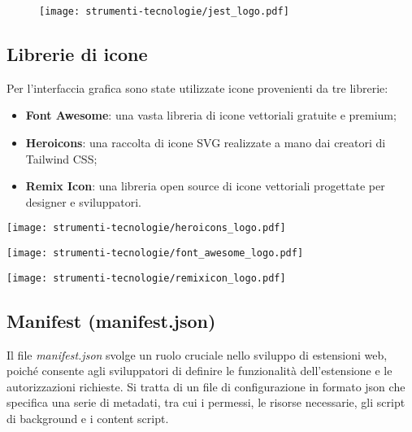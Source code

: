 \begin{figure}[H]
    \centering 
    \texttt{[image: strumenti-tecnologie/jest\_logo.pdf]} 
\end{figure}

\subsection*{Librerie di icone}

\par Per l’interfaccia grafica sono state utilizzate icone provenienti da tre librerie:
\begin{itemize}
  \item \textbf{Font Awesome}: una vasta libreria di icone vettoriali gratuite e premium;
  \item \textbf{Heroicons}: una raccolta di icone SVG realizzate a mano dai creatori di Tailwind CSS;
  \item \textbf{Remix Icon}: una libreria open source di icone vettoriali progettate per designer e sviluppatori.
\end{itemize}

\vspace{5pt}
\begin{center}
  \begin{minipage}{0.3\columnwidth}
    \centering
    \texttt{[image: strumenti-tecnologie/heroicons\_logo.pdf]} 
  \end{minipage}
  \hfill
  \begin{minipage}{0.3\columnwidth}
    \centering
    \texttt{[image: strumenti-tecnologie/font\_awesome\_logo.pdf]} 
  \end{minipage}
  \hfill
  \begin{minipage}{0.3\columnwidth}
    \centering
    \texttt{[image: strumenti-tecnologie/remixicon\_logo.pdf]} 
  \end{minipage}
\end{center}

\subsection*{Manifest (manifest.json)}

\par Il file \textit{manifest.json} svolge un ruolo cruciale nello sviluppo di estensioni web, poiché consente agli sviluppatori di definire le funzionalità dell’estensione e le autorizzazioni richieste. Si tratta di un file di configurazione in formato \gls{json} che specifica una serie di metadati, tra cui i permessi, le risorse necessarie, gli script di background e i content script.


